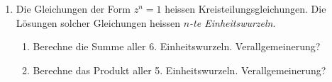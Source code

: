 \begin{ueb}{}{}
\begin{enumerate}
\begin{center}
    
        \end{center}

        \item Die Gleichungen der Form $z^n = 1$ heissen Kreisteilungsgleichungen. Die Lösungen solcher Gleichungen heissen \textit{$n$-te Einheitswurzeln}.
        \begin{enumerate}
           
            \item Berechne die Summe aller 6. Einheitswurzeln. Verallgemeinerung?
            \item  Berechne das Produkt aller 5. Einheitswurzeln. Verallgemeinerung?
        \end{enumerate}
    \end{enumerate}
\end{ueb}


